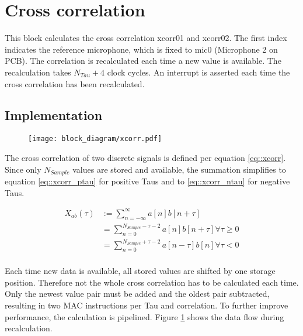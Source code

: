 \section{Cross correlation}
\label{sec::cic}

This block calculates the cross correlation xcorr01 and xcorr02.
The first index indicates the reference microphone, which is fixed to mic0 (Microphone 2 on PCB).
The correlation is recalculated each time a new value is available.
The recalculation takes $N_{Tau}+4$ clock cycles.
An interrupt is asserted each time the cross correlation has been recalculated.

\subsection{Implementation}
\begin{figure}[h]
	\centering
	\texttt{[image: block\_diagram/xcorr.pdf]}
	\label{fig::block_diag}
\end{figure}

The cross correlation of two discrete signals is defined per equation \ref{eq::xcorr}.
Since only $N_{Sample}$ values are stored and available, the summation simplifies to equation \ref{eq::xcorr_ptau} for positive Taus and to \ref{eq::xcorr_ntau} for negative Taus.

\begin{align}
X_{ab}(\tau) &:= \sum_{n=-\infty}^{\infty}a\left[n\right]b\left[n+\tau\right] \label{eq::xcorr}\\
&= \sum_{n=0}^{N_{Sample}-\tau-2}a\left[n\right]b\left[n+\tau\right] \forall\tau\ge0 \label{eq::xcorr_ptau} \\
&= \sum_{n=0}^{N_{Sample}+\tau-2}a\left[n-\tau\right]b\left[n\right] \forall\tau<0 \label{eq::xcorr_ntau} \\	
\end{align}

Each time new data is available, all stored values are shifted by one storage position.
Therefore not the whole cross correlation has to be calculated each time.
Only the newest value pair must be added and the oldest pair subtracted, resulting in two MAC instructions per Tau and correlation.
To further improve performance, the calculation is pipelined.
Figure \ref{fig::block_diag} shows the data flow during recalculation.

